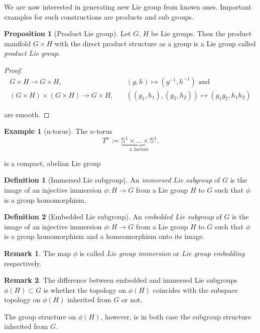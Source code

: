 \documentclass{article}
\theoremstyle{definition}
\newtheorem{definition}{Definition}[section]
\newtheorem{example}{Example}[section]
\newtheorem{remark}{Remark}[section]
\newtheorem{proposition}{Proposition}[section]
\begin{document}
We are now interested in generating new Lie group from known ones. Important examples for such constructions are products and sub groups.

\begin{proposition}[Product Lie group]
  Let $G$, $H$ be Lie groups. Then the product manifold $G\times H$ with the direct product structure as a group is a Lie group called \textit{product Lie group}.
\end{proposition}

\begin{proof}
  \begin{equation*}
    \begin{split}
  G\times H\to G\times H,&\quad(g,h)\mapsto(g^{-1},h^{-1})\text{ and}\\
  (G\times H)\times(G\times H)\to G\times H,&\quad\left((g_{1},h_{1}),(g_{2},h_{2})\right)\mapsto(g_{1}g_{2},h_{1}h_{2})
    \end{split}
  \end{equation*}

  are smooth.
\end{proof}

\begin{example}[n-torus]
  The $n$-torus
  $$
  T^{n}:=\underbrace{\mathbb{S}^{1}\times\hdots\times\mathbb{S}^{1}}_{n\text{ factors}}.
  $$

  is a compact, abelian Lie group
\end{example}

\begin{definition}[Immersed Lie subgroup]
  An \textit{immersed Lie subgroup} of $G$ is the image of an injective immersion $\phi:H\to G$ from a Lie group $H$ to $G$ such that $\phi$ is a group homomorphism.
\end{definition}

\begin{definition}[Embedded Lie subgroup]
  An \textit{embedded Lie subgroup} of $G$ is the image of an injective immersion $\phi:H\to G$ from a Lie group $H$ to $G$ such that $\phi$ is a group homomorphism and a homeomorphism onto its image.
\end{definition}

\begin{remark}
  The map $\phi$ is called \textit{Lie group immersion} or \textit{Lie group embedding} respectively.
\end{remark}

\begin{remark}
  The difference between embedded and immersed Lie subgroups $\phi(H)\subset G$ is whether the topology on $\phi(H)$ coincides with the subspace topology on $\phi(H)$ inherited from $G$ or not.

  The group structure on $\phi(H)$, however, is in both case the subgroup structure inherited from $G$.
\end{remark}
\end{document}
